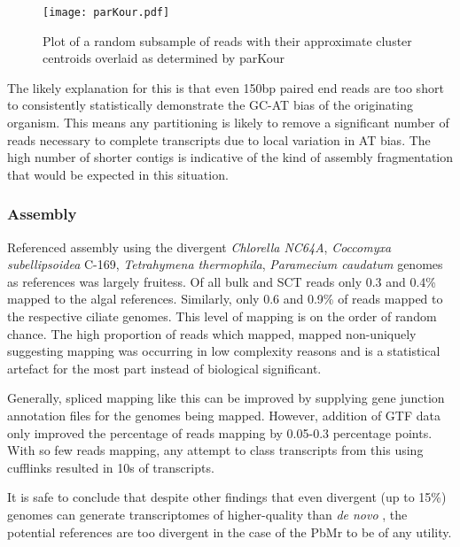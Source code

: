 \begin{figure}
    \texttt{[image: parKour.pdf]}
    \caption{Plot of a random subsample of reads with their approximate cluster centroids overlaid as determined by parKour}
\end{figure}

The likely explanation for this is that even 150bp paired end reads are too short to consistently
statistically demonstrate the GC-AT bias of the originating organism. This means any partitioning
is likely to remove a significant number of reads necessary to complete transcripts due to local
variation in AT bias.  The high number of shorter contigs is indicative of the kind of assembly
fragmentation that would be expected in this situation.
    
\subsubsection{Assembly}

Referenced assembly using the divergent \textit{Chlorella NC64A},
\textit{Coccomyxa subellipsoidea} C-169, \textit{Tetrahymena thermophila},
\textit{Paramecium caudatum} genomes as references was largely fruitess.
Of all bulk and SCT reads only 0.3 and 0.4\% mapped to the 
algal references.  Similarly, only 0.6 and 0.9\% of reads mapped to the 
respective ciliate genomes.   This level of mapping is on the order
of random chance.  The high proportion of reads which mapped, mapped non-uniquely
suggesting mapping was occurring in low complexity reasons and is a statistical
artefact for the most part instead of biological significant.

Generally, spliced mapping like this can be improved by supplying 
gene junction annotation files for the genomes being mapped.
However, addition of GTF data only improved the percentage of reads mapping
by 0.05-0.3 percentage points.  With so few reads mapping, any attempt to 
class transcripts from this using cufflinks resulted in 10s of transcripts.

It is safe to conclude that despite other findings that even divergent 
(up to 15\%) genomes can generate transcriptomes of higher-quality
than \textit{de novo} \citep{Vijay2013}, the potential references
are too divergent in the case of the PbMr to be of any utility.


%

